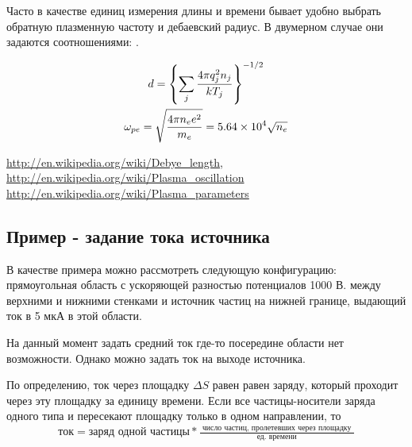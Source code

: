 Часто в качестве единиц измерения длины и времени бывает удобно выбрать
обратную плазменную частоту и дебаевский радиус. В двумерном случае
они задаются соотношениями: .

\begin{gather}
  d = \left\{ \sum_j {4\pi q^2_j n_j \over kT_j} \right\}^{-1/2}
  \\
  \omega_{pe} = \sqrt{4\pi n_e e^2 \over m_e} = 5.64 \times 10^4 \sqrt{n_e}
\end{gather}

\url{http://en.wikipedia.org/wiki/Debye_length}, 
\url{http://en.wikipedia.org/wiki/Plasma_oscillation}
\url{http://en.wikipedia.org/wiki/Plasma_parameters}

\subsection{ Пример - задание тока источника }

В качестве примера можно рассмотреть следующую конфигурацию:
прямоугольная область с ускоряющей разностью потенциалов 1000 В.
между верхними и нижними стенками и источник частиц на нижней границе,
выдающий ток в 5 мкА в этой области.

На данный момент задать средний ток где-то посередине области нет возможности.
Однако можно задать ток на выходе источника.

По определению, ток через площадку $\Delta S$ равен равен заряду,
который проходит через эту площадку за единицу времени. 
Если все частицы-носители заряда одного типа
и пересекают площадку только в одном направлении, то
\begin{gather}
  \mbox{ток} = 
  \mbox{заряд одной частицы} 
  * \frac{ \mbox{ число частиц, пролетевших через площадку } }
  {\mbox{ ед. времени } }
\end{gather}




